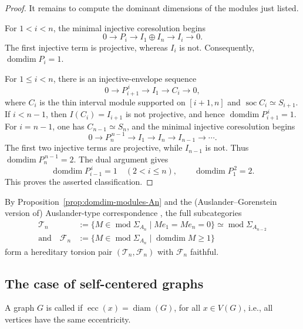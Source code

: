 \documentclass[a4paper,leqno]{amsart}
\begin{document}
\begin{proof}
It remains to compute the dominant dimensions of the modules just
listed. 

For $1<i<n$, the minimal injective coresolution begins
\[
0\longrightarrow P_i
 \longrightarrow I_1\oplus I_n
 \longrightarrow I_i
 \longrightarrow0.
\]
The first injective term is projective, whereas $I_i$ is not.
Consequently, $\operatorname{domdim}P_i=1$.

For $1\leq i<n$, there is an injective-envelope sequence
\[
0\longrightarrow P_{i+1}^{\,i}
 \longrightarrow I_1
 \longrightarrow C_i
 \longrightarrow0,
\]
where $C_i$ is the thin interval module supported on $[i+1,n]$ and
$\operatorname{soc}C_i\simeq S_{i+1}$. If $i<n-1$, then $I(C_i)=I_{i+1}$ is not projective, and hence $\operatorname{domdim}P_{i+1}^{\,i}=1$. For $i=n-1$, one has $C_{n-1}\simeq S_n$, and the minimal injective coresolution begins
\[
0\longrightarrow P_n^{\,n-1}
 \longrightarrow I_1
 \longrightarrow I_n
 \longrightarrow I_{n-1}
 \longrightarrow\cdots.
\]
The first two injective terms are projective, while $I_{n-1}$ is not. Thus $\operatorname{domdim}P_n^{\,n-1}=2$.
The dual argument gives
\[
\operatorname{domdim}P_{i-1}^{\,i}=1
\quad(2<i\leq n),
\qquad
\operatorname{domdim}P_1^{\,2}=2.
\]
This proves the asserted classification.
\end{proof}


\begin{rmk}\label{rmk:torsionfree-class-An}
By Proposition~\ref{prop:domdim-modules-An} and the (Auslander--Gorenstein version of) Auslander-type correspondence \cite[Theorem 4.4.1]{Iya07}, the full subcategories
\begin{align*}
\mathcal T_n
&:=\{M\in\operatorname{mod}\Sigma_{A_n}
  \mid Me_1=Me_n=0\}\simeq \operatorname{mod} \Sigma_{A_{n-2}}\\
\text{and}\quad  
\mathcal F_n &:=\{M\in\operatorname{mod}\Sigma_{A_n}
  \mid \operatorname{domdim}M\geq1\}
\end{align*}
form a hereditary torsion pair $(\mathcal T_n,\mathcal F_n)$ with $\mathcal F_n$ faithful. 
\end{rmk}

\subsection{The case of self-centered graphs}\label{sec:self-centered}

\begin{dfn}\label{def:self-centered}\cite{Buc89,BH90}
A graph $G$ is called  if $\operatorname{ecc}(x)=\operatorname{diam}(G)$, for all $x\in V(G)$, i.e., all vertices have the same eccentricity.
\end{dfn}
\end{document}
